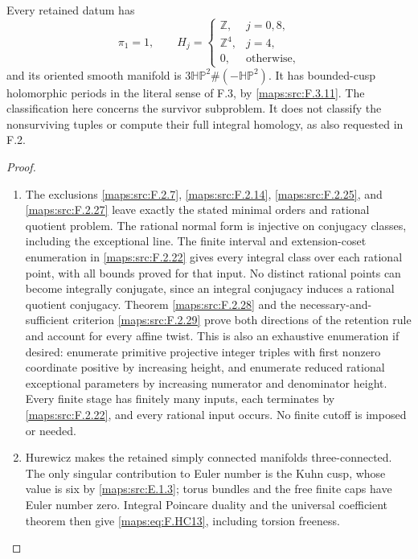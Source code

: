 \begin{corollary}
Every retained datum has
\[
 \pi_1=1,\qquad
 H_j=\begin{cases}
  \mathbb Z,&j=0,8,\\
  \mathbb Z^4,&j=4,\\
  0,&\text{otherwise},
 \end{cases}
 \tag{F.HC13}\label{maps:eq:F.HC13}
\]
and its oriented smooth manifold is
$3\mathbb{HP}^2\#(-\mathbb{HP}^2)$.
It has bounded-cusp holomorphic periods in the literal
sense of F.3, by \ref{maps:src:F.3.11}.
The classification here concerns the survivor subproblem.
It does not classify the nonsurviving tuples or compute
their full integral homology, as also requested in F.2.

\end{corollary}


\begin{proof}
\begin{enumerate}[label=\arabic*.]
\item The exclusions \ref{maps:src:F.2.7}, \ref{maps:src:F.2.14}, \ref{maps:src:F.2.25}, and \ref{maps:src:F.2.27}
leave exactly the stated minimal orders and rational
quotient problem.
The rational normal form is injective on conjugacy
classes, including the exceptional line.
The finite interval and extension-coset enumeration
in \ref{maps:src:F.2.22} gives every integral class over each rational
point, with all bounds proved for that input.
No distinct rational points can become integrally
conjugate, since an integral conjugacy induces a
rational quotient conjugacy.
Theorem \ref{maps:src:F.2.28} and the necessary-and-sufficient
criterion \ref{maps:src:F.2.29} prove both directions of the
retention rule and account for every affine twist.
This is also an exhaustive enumeration if desired:
enumerate primitive projective integer triples with
first nonzero coordinate positive by increasing height,
and enumerate reduced rational exceptional parameters
by increasing numerator and denominator height.
Every finite stage has finitely many inputs, each
terminates by \ref{maps:src:F.2.22}, and every rational input occurs.
No finite cutoff is imposed or needed.

\item Hurewicz makes the retained simply connected manifolds
three-connected.  The only singular contribution to
Euler number is the Kuhn cusp, whose value is six
by \ref{maps:src:E.1.3}; torus bundles and the free finite caps have
Euler number zero.
Integral Poincare duality and the universal coefficient
theorem then give \eqref{maps:eq:F.HC13}, including torsion freeness.


\end{enumerate}
\end{proof}
